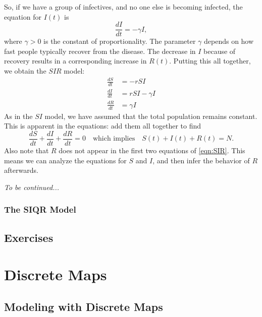\documentclass{book}
\begin{document}
So, if we have a group of infectives, and no
one else is becoming infected, the equation
for $I(t)$ is
\begin{equation}
  \frac{dI}{dt} = -\gamma I,
\end{equation}
where $\gamma > 0$ is the constant of proportionality.
The parameter $\gamma$ depends on how fast people
typically recover from the disease.
The decrease in $I$ because of recovery results
in a corresponding increase in $R(t)$.
Putting this all together, we obtain the
$SIR$ model:
\begin{equation}
\begin{split}
   \frac{dS}{dt} & = -r S I \\
   \frac{dI}{dt} & = r S I - \gamma I \\
   \frac{dR}{dt} & = \gamma I
\end{split}
\label{eqn:SIR}
\end{equation}
As in the $SI$ model, we have assumed that the total
population remains constant.  This is apparent in the equations:
add them all together to find
\begin{equation}
   \frac{dS}{dt} + \frac{dI}{dt} + \frac{dR}{dt} = 0
   \quad \textrm{which implies} \quad
   S(t) + I(t) + R(t) = N.
\end{equation}
Also note that $R$ does not appear in the first two equations
of \eqref{eqn:SIR}.  This means we can analyze the equations
for $S$ and $I$, and then infer the behavior of $R$ afterwards.

\medskip
\noindent
\emph{To be continued...}


\subsection{The SIQR Model}
\section{Exercises}
%
%
%

\chapter{Discrete Maps}
%
\section{Modeling with Discrete Maps}
%
\end{document}
